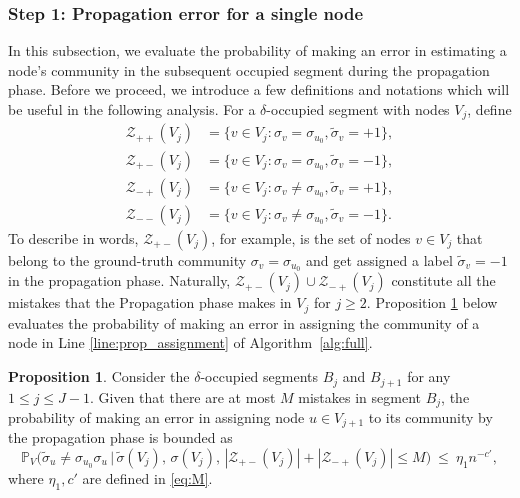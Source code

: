 \documentclass[letterpaper,11pt]{article}
\newtheorem{prop}[thm]{Proposition}
\theoremstyle{definition}
\def\P{\mathbb{P}}
\newcommand{\tsigma}{\tilde{\sigma}}
\def\cZ{\mathcal{Z}}
\def\wle{ \ \le \ }
\numberwithin{equation}{section}
\newtheorem{prop}[thm]{Proposition}
\theoremstyle{definition}
\def\P{\mathbb{P}}
\newcommand{\tsigma}{\tilde{\sigma}}
\def\cZ{\mathcal{Z}}
\def\wle{ \ \le \ }
\numberwithin{equation}{section}
\theoremstyle{thmstyletwo}%
\begin{document}
\subsubsection{Step 1: Propagation error for a single node}
In this subsection, we evaluate the probability of making an error in estimating a node's community in the subsequent occupied segment during the propagation phase. Before we proceed, we introduce a few definitions and notations which will be useful in the following analysis. For a $\delta$-occupied segment with nodes $V_j$, define
\begin{align}
\cZ_{++}(V_j) &= \{v\in V_j : \sigma_v = \sigma_{u_0}, \tsigma_v=+1\}, \nonumber\\
\cZ_{+-}(V_j) &= \{v\in V_j : \sigma_v = \sigma_{u_0}, \tsigma_v=-1\}, \nonumber\\
\cZ_{-+}(V_j) &= \{v\in V_j : \sigma_v \neq \sigma_{u_0}, \tsigma_v=+1\}, \nonumber\\
\cZ_{--}(V_j) &= \{v\in V_j : \sigma_v \neq \sigma_{u_0}, \tsigma_v=-1\}.
\label{eq:error_nbrs}
\end{align}
To describe in words, $\cZ_{+-}(V_j)$, for example, is the set of nodes  $v\in V_j$ that belong to the ground-truth community $\sigma_v = \sigma_{u_0}$ and get assigned a label $\tsigma_v = -1$ in the propagation phase. Naturally, $\cZ_{+-}(V_j) \cup \cZ_{-+}(V_j)$ constitute all the mistakes that the Propagation phase makes in $V_j$ for $j\ge2$. 
Proposition \ref{prop:prop_single_error} below evaluates the probability of making an error in assigning the community of a node in Line \ref{line:prop_assignment} of Algorithm~\ref{alg:full}. 
\begin{prop}
\label{prop:prop_single_error}
Consider the $\delta$-occupied segments $B_j$ and $B_{j+1}$ for any $1\le j\le J-1$. Given that there are at most $M$ mistakes in segment $B_j$, the probability of making an error in assigning node $u\in V_{j+1}$ to its community by the propagation phase is bounded as
\[
 \P_V \Big(\tsigma_u \ne \sigma_{u_0}\sigma_u \, \Big| \,
 \tilde{\sigma}(V_j), \, \sigma(V_j), \, |\cZ_{+-}(V_j)| + |\cZ_{-+}(V_j)| \le M \Big)
 \wle 
 \eta_1n^{-c'},
\]
where $\eta_1, c' $ are defined in \eqref{eq:M}.
\end{prop}
\end{document}
